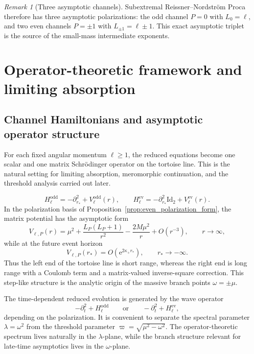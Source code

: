 \documentclass[12pt]{article}
\numberwithin{equation}{section}
\theoremstyle{plain}
\theoremstyle{definition}
\theoremstyle{remark}
\newtheorem{remark}{Remark}[section]
\newcommand{\ee}{\mathrm e}
\newcommand{\om}{\omega}
\newcommand{\vp}{\varpi}
\newcommand{\Id}{\mathrm{Id}}
\begin{document}
\begin{remark}[Three asymptotic channels]\label{rem:three_channels}
Subextremal Reissner--Nordstr\"om Proca therefore has three asymptotic polarizations: the odd channel $P=0$ with $L_0=\ell$, and two even channels $P=\pm1$ with $L_{\pm1}=\ell\pm1$.  This exact asymptotic triplet is the source of the small-mass intermediate exponents.
\end{remark}


\section{Operator-theoretic framework and limiting absorption}\label{sec:functional_framework}

\subsection{Channel Hamiltonians and asymptotic operator structure}

For each fixed angular momentum $\ell\ge1$, the reduced equations become one scalar and one matrix Schr\"odinger operator on the tortoise line.  This is the natural setting for limiting absorption, meromorphic continuation, and the threshold analysis carried out later.

\begin{equation}\label{eq:channel_hamiltonians}
   H_{\ell}^{\mathrm{odd}}=-\partial_{r_*}^2+V_{\ell}^{\mathrm{odd}}(r),
   \qquad
   H_{\ell}^{\mathrm{ev}}=-\partial_{r_*}^2\Id_2+V_{\ell}^{\mathrm{ev}}(r).
\end{equation}
In the polarization basis of Proposition~\ref{prop:even_polarization_form}, the matrix potential has the asymptotic form
\begin{equation}\label{eq:asymptotic_channel_potential}
   V_{\ell,P}(r)
   =
   \mu^2+\frac{L_P(L_P+1)}{r^2}-\frac{2M\mu^2}{r}+O(r^{-3}),
   \qquad
   r\to\infty,
\end{equation}
while at the future event horizon
\begin{equation}\label{eq:horizon_potential_decay}
   V_{\ell,P}(r_*)=O(\ee^{2\kappa_+ r_*}),
   \qquad
   r_*\to-\infty.
\end{equation}
Thus the left end of the tortoise line is short range, whereas the right end is long range with a Coulomb term and a matrix-valued inverse-square correction.  This step-like structure is the analytic origin of the massive branch points $\om=\pm\mu$.

The time-dependent reduced evolution is generated by the wave operator
\[
   -\partial_t^2+H_{\ell}^{\mathrm{odd}}
   \qquad\text{or}\qquad
   -\partial_t^2+H_{\ell}^{\mathrm{ev}},
\]
depending on the polarization.  It is convenient to separate the spectral parameter $\lambda=\om^2$ from the threshold parameter $\vp=\sqrt{\mu^2-\om^2}$.  The operator-theoretic spectrum lives naturally in the $\lambda$-plane, while the branch structure relevant for late-time asymptotics lives in the $\om$-plane.
\end{document}
